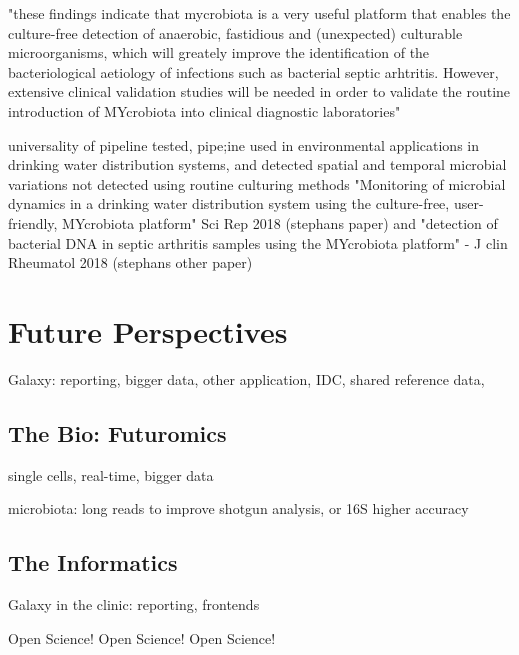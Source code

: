 "these findings indicate that mycrobiota is a very useful platform that enables the culture-free detection of anaerobic, fastidious and (unexpected) culturable microorganisms, which will greately improve the identification of the bacteriological aetiology of infections such as bacterial septic arhtritis. However, extensive clinical validation studies will be needed in order to validate the routine introduction of MYcrobiota into clinical diagnostic laboratories"

universality of pipeline tested, pipe;ine used in environmental applications in drinking water distribution systems, and detected spatial and temporal microbial variations not detected using routine culturing methods "Monitoring of microbial dynamics in a drinking water distribution system using the culture-free, user-friendly, MYcrobiota platform" Sci Rep 2018 (stephans paper) and "detection of bacterial DNA in septic arthritis samples using the MYcrobiota platform" - J clin Rheumatol 2018 (stephans other paper)


\section{Future Perspectives}

Galaxy: reporting, bigger data, other application, IDC, shared reference data,

\subsection{The Bio: Futuromics}
single cells, real-time, bigger data

microbiota: long reads to improve shotgun analysis, or 16S higher accuracy

\subsection{The Informatics}

Galaxy in the clinic: reporting, frontends

Open Science! Open Science! Open Science!



